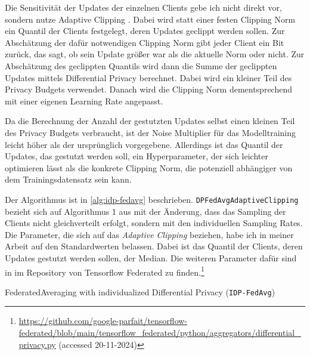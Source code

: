 Die Sensitivität der Updates der einzelnen Clients gebe ich nicht direkt vor, sondern nutze Adaptive Clipping \cite{andrew:2021}. Dabei wird statt einer festen Clipping Norm ein Quantil der Clients festgelegt, deren Updates geclippt werden sollen. Zur Abschätzung der dafür notwendigen Clipping Norm gibt jeder Client ein Bit zurück, das sagt, ob sein Update größer war als die aktuelle Norm oder nicht. Zur Abschätzung des geclippten Quantils wird dann die Summe der geclippten Updates mittels Differential Privacy berechnet. Dabei wird ein kleiner Teil des Privacy Budgets verwendet. Danach wird die Clipping Norm dementsprechend mit einer eigenen Learning Rate angepasst. 

Da die Berechnung der Anzahl der gestutzten Updates selbst einen kleinen Teil des Privacy Budgets verbraucht, ist der Noise Multiplier für das Modelltraining leicht höher als der ursprünglich vorgegebene. Allerdings ist das Quantil der Updates, das gestutzt werden soll, ein Hyperparameter, der sich leichter optimieren lässt als die konkrete Clipping Norm, die potenziell abhängiger von dem Trainingsdatensatz sein kann.

Der Algorithmus ist in \autoref{alg:idp-fedavg} beschrieben. \texttt{DPFedAvgAdaptiveClipping} bezieht sich auf Algorithmus 1 aus \textcite[p.4]{andrew:2021} mit der Änderung, dass das Sampling der Clients nicht gleichverteilt erfolgt, sondern mit den individuellen Sampling Rates. Die Parameter, die sich auf das \textit{Adaptive Clipping} beziehen, habe ich in meiner Arbeit auf den Standardwerten belassen. Dabei ist das Quantil der Clients, deren Updates gestutzt werden sollen, der Median. Die weiteren Parameter dafür sind in im Repository von Tensorflow Federated zu finden.\footnote{\url{https://github.com/google-parfait/tensorflow-federated/blob/main/tensorflow_federated/python/aggregators/differential_privacy.py} (accessed 20-11-2024)}


\begin{algorithm}[tb]
	\caption{FederatedAveraging with individualized Differential Privacy (\texttt{IDP-FedAvg})}
	\label{alg:idp-fedavg}
\end{algorithm}